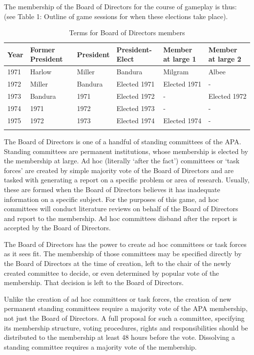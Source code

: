 The membership of the Board of Directors for the course of gameplay is thus: (see Table 1: Outline of game sessions for when these elections take place).

 \begin{longtable}[!t]{ | p{1cm} | p{2.5cm} | p{2.5cm} | p{2.5cm} | p{2.5cm} |  p{2.5cm} | }
\hline
\textbf{Year}&\textbf{Former President}&\textbf{President}&\textbf{President-Elect}&\textbf{Member at large 1}&\textbf{Member at large 2} \\ \hline
1971&Harlow&Miller&Bandura&Milgram&Albee\\
1972&Miller&Bandura&Elected 1971&Elected 1971&-\\
1973&Bandura&1971&Elected 1972&-&Elected 1972\\
1974&1971&1972&Elected 1973&-&-\\
1975&1972&1973&Elected 1974&Elected 1974&-\\
\caption{Terms for Board of Directors members}
\label{table: boardMembership}
\end{longtable}

The Board of Directors is one of a handful of standing committees of the APA. Standing committees are permanent institutions, whose membership is elected by the membership at large. Ad hoc (literally `after the fact') committees or `task forces' are created by simple majority vote of the Board of Directors and are tasked with generating a report on a specific problem or area of research. Usually, these are formed when the Board of Directors believes it has inadequate information on a specific subject. For the purposes of this game, ad hoc committees will conduct literature reviews on behalf of the Board of Directors and report to the membership. Ad hoc committees disband after the report is accepted by the Board of Directors. 

The Board of Directors has the power to create ad hoc committees or task forces as it sees fit. The membership of those committees may be specified directly by the Board of Directors at the time of creation, left to the chair of the newly created committee to decide, or even determined by popular vote of the membership. That decision is left to the Board of Directors.

Unlike the creation of ad hoc committees or task forces, the creation of new permanent standing committees require a majority vote of the APA membership, not just the Board of Directors. A full proposal for such a committee, specifying its membership structure, voting procedures, rights and responsibilities should be distributed to the membership at least 48 hours before the vote. Dissolving a standing committee requires a majority vote of the membership.


